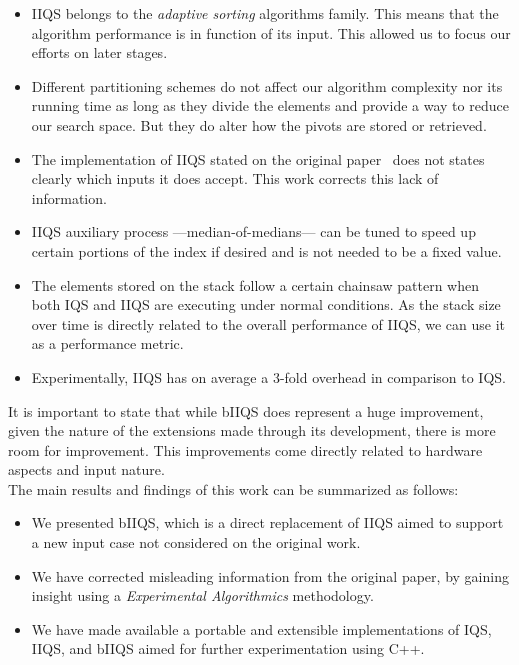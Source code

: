 \begin{itemize}
    \item IIQS belongs to the \emph{adaptive sorting} algorithms family. This means that the algorithm performance is in function of its input. This allowed us to focus our efforts on later stages.
    \item Different partitioning schemes do not affect our algorithm complexity nor its running time as long as they divide the elements and provide a way to reduce our search space. But they do alter how the pivots are stored or retrieved.
    \item The implementation of IIQS stated on the original paper~\cite{7416566} does not states clearly which inputs it does accept. This work corrects this lack of information.
    \item IIQS auxiliary process ---median-of-medians--- can be tuned to speed up certain portions of the index if desired and is not needed to be a fixed value.
    \item The elements stored on the stack follow a certain chainsaw pattern when both IQS and IIQS are executing under normal conditions. As the stack size over time is directly related to the overall performance of IIQS, we can use it as a performance metric.
    \item Experimentally, IIQS has on average a 3-fold overhead in comparison to IQS.
\end{itemize}


It is important to state that while bIIQS does represent a huge improvement, given the nature of the extensions made through its development, there is more room for improvement. This improvements come directly related to hardware aspects and input nature.\\

The main results and findings of this work can be summarized as follows:
\begin{itemize}
    \item We presented bIIQS, which is a direct replacement of IIQS aimed to support a new input case not considered on the original work.
    \item We have corrected misleading information from the original paper, by gaining insight using a \emph{Experimental Algorithmics} methodology.
    \item We have made available a portable and extensible implementations of IQS, IIQS, and bIIQS aimed for further experimentation using C++.
\end{itemize}

